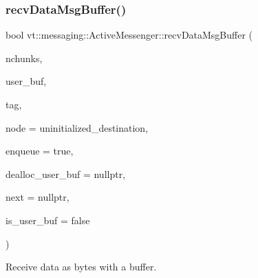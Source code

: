 \subsubsection{\texorpdfstring{recv\+Data\+Msg\+Buffer()}{recvDataMsgBuffer()}\hspace{0.1cm}{\footnotesize\ttfamily [2/2]}}
{\footnotesize\ttfamily bool vt\+::messaging\+::\+Active\+Messenger\+::recv\+Data\+Msg\+Buffer (\begin{DoxyParamCaption}\item[{int}]{nchunks,  }\item[{void $\ast$const}]{user\+\_\+buf,  }\item[{\hyperlink{namespacevt_a84ab281dae04a52a4b243d6bf62d0e52}{Tag\+Type} const \&}]{tag,  }\item[{\hyperlink{namespacevt_a866da9d0efc19c0a1ce79e9e492f47e2}{Node\+Type} const \&}]{node = {\ttfamily uninitialized\+\_\+destination},  }\item[{bool const \&}]{enqueue = {\ttfamily true},  }\item[{\hyperlink{namespacevt_ae0a5a7b18cc99d7b732cb4d44f46b0f3}{Action\+Type}}]{dealloc\+\_\+user\+\_\+buf = {\ttfamily nullptr},  }\item[{\hyperlink{namespacevt_a6de3bd201e2a040be9362d9d24d1e446}{Continuation\+Deleter\+Type}}]{next = {\ttfamily nullptr},  }\item[{bool}]{is\+\_\+user\+\_\+buf = {\ttfamily false} }\end{DoxyParamCaption})}



Receive data as bytes with a buffer. 



